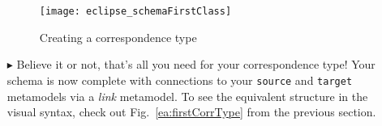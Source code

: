 \begin{itemize}
\begin{figure}[htbp]
\begin{center}
  \texttt{[image: eclipse\_schemaFirstClass]}
  \caption{Creating a correspondence type}
  \label{eclipse:firstCorrType}
\end{center}
\end{figure}

\item[$\blacktriangleright$] Believe it or not, that's all you need for your correspondence type! Your schema is now complete with connections to your
\texttt{source} and \texttt{target} metamodels via a \emph{link} metamodel. To see the equivalent structure in the visual syntax, check out
Fig.~\ref{ea:firstCorrType} from the previous section.

\end{itemize}

